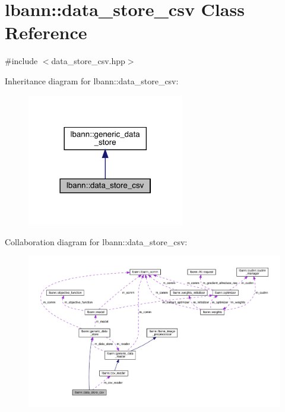 \hypertarget{classlbann_1_1data__store__csv}{}\section{lbann\+:\+:data\+\_\+store\+\_\+csv Class Reference}
\label{classlbann_1_1data__store__csv}


{\ttfamily \#include $<$data\+\_\+store\+\_\+csv.\+hpp$>$}



Inheritance diagram for lbann\+:\+:data\+\_\+store\+\_\+csv\+:\nopagebreak
\begin{figure}[H]
\begin{center}
\leavevmode
\includegraphics[width=194pt]{classlbann_1_1data__store__csv__inherit__graph}
\end{center}
\end{figure}


Collaboration diagram for lbann\+:\+:data\+\_\+store\+\_\+csv\+:\nopagebreak
\begin{figure}[H]
\begin{center}
\leavevmode
\includegraphics[width=350pt]{classlbann_1_1data__store__csv__coll__graph}
\end{center}
\end{figure}
